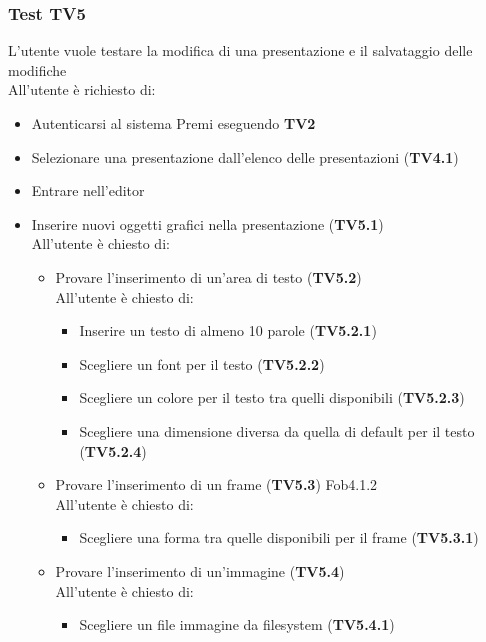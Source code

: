 \subsubsection {Test TV5} %

L'utente vuole testare la modifica di una presentazione e il salvataggio delle modifiche\\
All'utente è richiesto di:

\begin{itemize}
	\item Autenticarsi al sistema Premi eseguendo \textbf{TV2}
	\item Selezionare una presentazione dall'elenco delle presentazioni (\textbf{TV4.1})
	\item Entrare nell'editor
	\item Inserire nuovi oggetti grafici nella presentazione (\textbf{TV5.1})\\
	All'utente è chiesto di:
	\begin{itemize}
		\item Provare l'inserimento di un'area di testo (\textbf{TV5.2})\\
		All'utente è chiesto di:
		\begin{itemize}
			\item Inserire un testo di almeno 10 parole  (\textbf{TV5.2.1})
			\item Scegliere un font per il testo (\textbf{TV5.2.2}) 
			\item Scegliere un colore per il testo tra quelli disponibili (\textbf{TV5.2.3})
			\item Scegliere una dimensione diversa da quella di default per il testo (\textbf{TV5.2.4})
		\end{itemize}
       \item Provare l'inserimento di un frame  (\textbf{TV5.3}) Fob4.1.2\\
        All'utente è chiesto di:		
        \begin{itemize}
        	\item Scegliere una forma tra quelle disponibili per il frame  (\textbf{TV5.3.1})
        \end{itemize}
        \item Provare l'inserimento di un'immagine  (\textbf{TV5.4})\\
        All'utente è chiesto di:		
        \begin{itemize}
        	\item Scegliere un file immagine da filesystem (\textbf{TV5.4.1})

\end{itemize}
\end{itemize}
\end{itemize}
